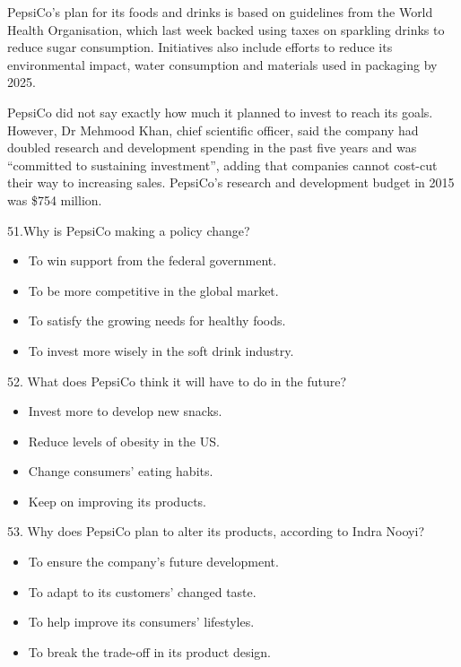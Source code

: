 \documentclass[UTF8,11pt]{ctexart}
\begin{document}
PepsiCo's plan for its foods and drinks is based on guidelines from the World Health Organisation, which last week backed using taxes on sparkling drinks to reduce sugar consumption. Initiatives also include efforts to reduce its environmental impact, water consumption and materials used in packaging by 2025.


PepsiCo did not say exactly how much it planned to invest to reach its goals. However, Dr Mehmood Khan, chief scientific officer, said the company had doubled research and development spending in the past five years and was “committed to sustaining investment”, adding that companies cannot cost-cut their way to increasing sales. PepsiCo's research and development budget in 2015 was \$754 million.


51.Why is PepsiCo making a policy change?


\begin{itemize}[leftmargin=2em,itemsep=.2em,topsep=.4em]\item[A.] To win support from the federal government.
\item[B.] To be more competitive in the global market.
\item[C.] To satisfy the growing needs for healthy foods.
\item[D.] To invest more wisely in the soft drink industry.
\end{itemize}

52. What does PepsiCo think it will have to do in the future?


\begin{itemize}[leftmargin=2em,itemsep=.2em,topsep=.4em]\item[A.] Invest more to develop new snacks.
\item[B.] Reduce levels of obesity in the US.
\item[C.] Change consumers’ eating habits.
\item[D.] Keep on improving its products.
\end{itemize}

53. Why does PepsiCo plan to alter its products, according to Indra Nooyi?


\begin{itemize}[leftmargin=2em,itemsep=.2em,topsep=.4em]\item[A.] To ensure the company’s future development.
\item[B.] To adapt to its customers’ changed taste.
\item[C.] To help improve its consumers’ lifestyles.
\item[D.] To break the trade-off in its product design.
\end{itemize}
\end{document}
